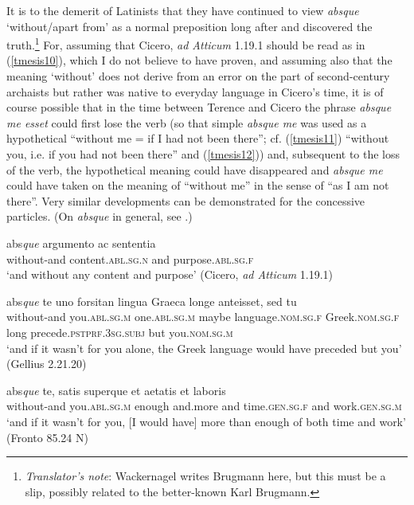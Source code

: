 It is to the demerit of Latinists that they have continued to view \emph{absque} `without/apart from' as a normal preposition long after \citet{Schoemann1871} and \citet{Brugman1877} discovered the truth.\footnote{\emph{Translator's note}: Wackernagel writes Brugmann here, but this must be a slip, possibly related to the better-known Karl Brugmann.} For, assuming that Cicero, \textit{ad Atticum} 1.19.1 should be read as in (\ref{tmesis10}), which I do not believe \citet{Woelfflin1882} to have proven, and assuming also that the meaning `without' does not derive from an error on the part of second-century archaists but rather was native to everyday language in Cicero's time, it is of course possible that in the time between Terence and Cicero the phrase \emph{absque me esset} could first lose the verb (so that simple \emph{absque me} was used as a hypothetical ``without me = if I had not been there''; cf. (\ref{tmesis11}) ``without you, i.e. if you had not been there'' and (\ref{tmesis12})) and, subsequent to the loss of the verb, the hypothetical meaning could have disappeared and \emph{absque me} could have taken on the meaning of ``without me'' in the sense of ``as I am not there''. Very similar developments can be demonstrated for the concessive particles. (On \emph{absque} in general, see \citealp{Praun1889}.)

\begin{exe}
\ex
\gll abs\emph{que} argumento ac sententia\\
without-and content.\textsc{abl.sg.n} and purpose.\textsc{abl.sg.f}\\ 
\trans `and without any content and purpose' (Cicero, \textit{ad Atticum} 1.19.1)
\label{tmesis10}
\end{exe}

\begin{exe}
\ex
\gll abs\emph{que} te uno forsitan lingua Graeca longe anteisset, sed tu\\
without-and you.\textsc{abl.sg.m} one.\textsc{abl.sg.m} maybe language.\textsc{nom.sg.f} Greek.\textsc{nom.sg.f} long precede.\textsc{pstprf.3sg.subj} but you.\textsc{nom.sg.m}\\ 
\trans `and if it wasn't for you alone, the Greek language would have preceded but you' (Gellius 2.21.20)
\label{tmesis11}
\end{exe}

\begin{exe}
\ex
\gll abs\emph{que} te, satis superque et aetatis et laboris\\
without-and you.\textsc{abl.sg.m} enough and.more and time.\textsc{gen.sg.f} and work.\textsc{gen.sg.m}\\
\trans `and if it wasn't for you, [I would have] more than enough of both time and work' (Fronto 85.24 N)
\label{tmesis12}
\end{exe}

